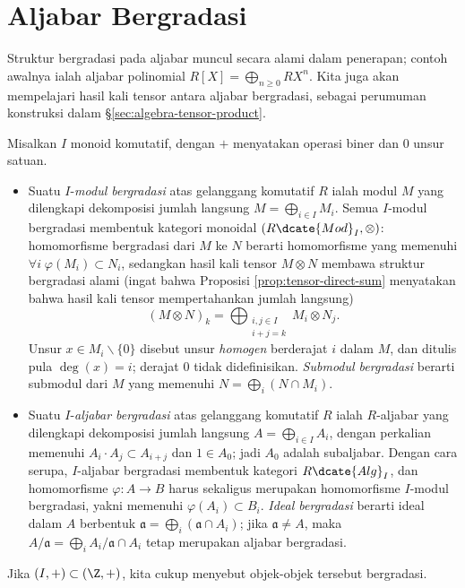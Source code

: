 \section{Aljabar Bergradasi}
Struktur bergradasi pada aljabar muncul secara alami dalam penerapan; contoh awalnya ialah aljabar polinomial $R[X] = \bigoplus_{n \geq 0} R X^n$. Kita juga akan mempelajari hasil kali tensor antara aljabar bergradasi, sebagai perumuman konstruksi dalam \S\ref{sec:algebra-tensor-product}.

\begin{definition}\label{def:graded-module-alg}
	Misalkan $I$ monoid komutatif, dengan $+$ menyatakan operasi biner dan $0$ unsur satuan.
	\begin{itemize}
		\item Suatu $I$-\emph{modul bergradasi} atas gelanggang komutatif $R$ ialah modul $M$ yang dilengkapi dekomposisi jumlah langsung $M = \bigoplus_{i \in I} M_i$. Semua $I$-modul bergradasi membentuk kategori monoidal $(R\dcate{Mod}_I, \otimes)$: homomorfisme bergradasi dari $M$ ke $N$ berarti homomorfisme yang memenuhi $\forall i \; \varphi(M_i) \subset N_i$, sedangkan hasil kali tensor $M \otimes N$ membawa struktur bergradasi alami (ingat bahwa Proposisi \ref{prop:tensor-direct-sum} menyatakan bahwa hasil kali tensor mempertahankan jumlah langsung)
		\[ (M \otimes N)_k = \bigoplus_{\substack{i,j \in I \\ i+j=k}} M_i \otimes N_j. \]
		Unsur $x \in M_i \smallsetminus \{0\}$ disebut unsur \emph{homogen} berderajat $i$ dalam $M$, dan ditulis pula $\deg(x)=i$; derajat $0$ tidak didefinisikan. \emph{Submodul bergradasi} berarti submodul dari $M$ yang memenuhi $N = \bigoplus_i (N \cap M_i)$.
		\item Suatu $I$-\emph{aljabar bergradasi} atas gelanggang komutatif $R$ ialah $R$-aljabar yang dilengkapi dekomposisi jumlah langsung $A = \bigoplus_{i \in I} A_i$, dengan perkalian memenuhi $A_i \cdot A_j \subset A_{i+j}$ dan $1 \in A_0$; jadi $A_0$ adalah subaljabar. Dengan cara serupa, $I$-aljabar bergradasi membentuk kategori $R\dcate{Alg}_I$, dan homomorfisme $\varphi: A \to B$ harus sekaligus merupakan homomorfisme $I$-modul bergradasi, yakni memenuhi $\varphi(A_i) \subset B_i$. \emph{Ideal bergradasi} berarti ideal dalam $A$ berbentuk $\mathfrak{a} = \bigoplus _i (\mathfrak{a} \cap A_i)$; jika $\mathfrak{a} \neq A$, maka $A/\mathfrak{a} = \bigoplus_i A_i/\mathfrak{a} \cap A_i$ tetap merupakan aljabar bergradasi.
	\end{itemize}
	Jika $(I,+) \subset (\Z,+)$, kita cukup menyebut objek-objek tersebut bergradasi.
\end{definition}

